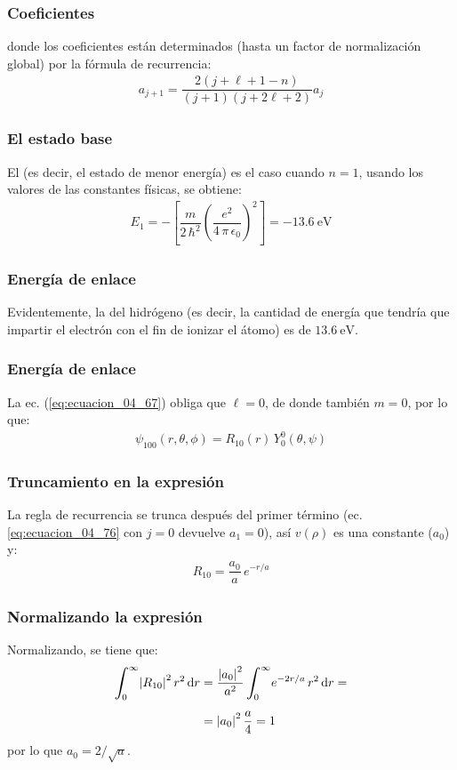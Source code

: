 \documentclass[12pt]{beamer}
\begin{document}
\begin{frame}
\frametitle{Coeficientes}
donde los coeficientes están determinados (hasta un factor de normalización global) por la fórmula de recurrencia:
\pause
\begin{align}
a_{j+1} = \dfrac{2 (j + \ell + 1 - n)}{(j + 1)(j + 2 \ell + 2)} a_{j}
\label{eq:ecuacion_04_76}
\end{align}
\end{frame}
\begin{frame}
\frametitle{El estado base}
El  (es decir, el estado de menor energía) es el caso cuando $n = 1$, usando los valores de las constantes físicas, se obtiene:
\pause
\begin{align}
E_{1} = - \left[ \dfrac{m}{2 \, \hbar^{2}} \left( \dfrac{e^{2}}{4 \, \pi \, \epsilon_{0}} \right)^{2} \right] =  \SI{-13.6}{\electronvolt}
\label{eq:ecuacion_04_77}
\end{align}
\end{frame}
\begin{frame}
\frametitle{Energía de enlace}
Evidentemente, la  del hidrógeno (es decir, la cantidad de energía que tendría que impartir el electrón con el fin de ionizar el átomo) es de $\SI{13.6}{\electronvolt}$.
\end{frame}
\begin{frame}
\frametitle{Energía de enlace}
La ec. (\ref{eq:ecuacion_04_67}) obliga que $\ell = 0$, de donde también $m = 0$, por lo que:
\pause
\begin{align}
\psi_{100} (r, \theta, \phi) = R_{10}(r) \, Y_{0}^{0} (\theta, \psi)
\label{eq:ecuacion_04_78}
\end{align}
\end{frame}
\begin{frame}
\frametitle{Truncamiento en la expresión}
La regla de recurrencia se trunca después del primer término (ec. \ref{eq:ecuacion_04_76} con $j = 0$ devuelve $a_{1} = 0$), así $v (\rho)$ es una constante ($a_{0}$) y:
\pause
\begin{align}
R_{10} = \dfrac{a_{0}}{a} \, e^{-r/a}
\label{eq:ecuacion_04_79}
\end{align}
\end{frame}
\begin{frame}
\frametitle{Normalizando la expresión}
Normalizando, se tiene que:
\pause
\begin{align*}
\scaleint{6ex}_{\bs 0}^{\infty} \abs{R_{10}}^{2} \, r^{2} \dd{r} &= \dfrac{\abs{a_{0}}^{2}}{a^{2}} \, \scaleint{6ex}_{\bs 0}^{\infty} e^{-2r/a} \, r^{2} \dd{r} = \\[0.5em]
&= \abs{a_{0}}^{2} \, \dfrac{a}{4} =  1
\end{align*}
por lo que $a_{0} = 2 / \sqrt{a}$.
\end{frame}
\end{document}
